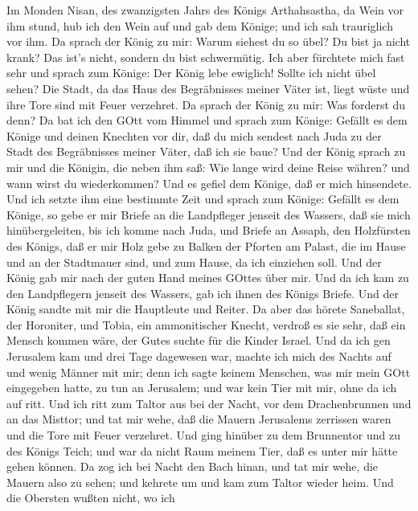  Im Monden Nisan, des zwanzigsten Jahrs des Königs
Arthahsastha, da Wein vor ihm stund, hub ich den Wein auf und gab dem
Könige; und ich sah trauriglich vor ihm.  Da sprach der
König zu mir: Warum siehest du so übel? Du bist ja nicht krank? Das
ist's nicht, sondern du bist schwermütig. Ich aber fürchtete mich fast
sehr  und sprach zum Könige: Der König lebe ewiglich! Sollte
ich nicht übel sehen? Die Stadt, da das Haus des Begräbnisses meiner
Väter ist, liegt wüste und ihre Tore sind mit Feuer verzehret.
 Da sprach der König zu mir: Was forderst du denn? Da bat
ich den GOtt vom Himmel  und sprach zum Könige: Gefällt es
dem Könige und deinen Knechten vor dir, daß du mich sendest nach Juda zu
der Stadt des Begräbnisses meiner Väter, daß ich sie baue? 
Und der König sprach zu mir und die Königin, die neben ihm saß: Wie
lange wird deine Reise währen? und wann wirst du wiederkommen? Und es
gefiel dem Könige, daß er mich hinsendete. Und ich setzte ihm eine
bestimmte Zeit  und sprach zum Könige: Gefällt es dem
Könige, so gebe er mir Briefe an die Landpfleger jenseit des Wassers,
daß sie mich hinübergeleiten, bis ich komme nach Juda,  und
Briefe an Assaph, den Holzfürsten des Königs, daß er mir Holz gebe zu
Balken der Pforten am Palast, die im Hause und an der Stadtmauer sind,
und zum Hause, da ich einziehen soll. Und der König gab mir nach der
guten Hand meines GOttes über mir.  Und da ich kam zu den
Landpflegern jenseit des Wassers, gab ich ihnen des Königs Briefe. Und
der König sandte mit mir die Hauptleute und Reiter.  Da
aber das hörete Saneballat, der Horoniter, und Tobia, ein ammonitischer
Knecht, verdroß es sie sehr, daß ein Mensch kommen wäre, der Gutes
suchte für die Kinder Israel.  Und da ich gen Jerusalem kam
und drei Tage dagewesen war,  machte ich mich des Nachts
auf und wenig Männer mit mir; denn ich sagte keinem Menschen, was mir
mein GOtt eingegeben hatte, zu tun an Jerusalem; und war kein Tier mit
mir, ohne da ich auf ritt.  Und ich ritt zum Taltor aus bei
der Nacht, vor dem Drachenbrunnen und an das Misttor; und tat mir wehe,
daß die Mauern Jerusalems zerrissen waren und die Tore mit Feuer
verzehret.  Und ging hinüber zu dem Brunnentor und zu des
Königs Teich; und war da nicht Raum meinem Tier, daß es unter mir hätte
gehen können.  Da zog ich bei Nacht den Bach hinan, und tat
mir wehe, die Mauern also zu sehen; und kehrete um und kam zum Taltor
wieder heim.  Und die Obersten wußten nicht, wo ich

